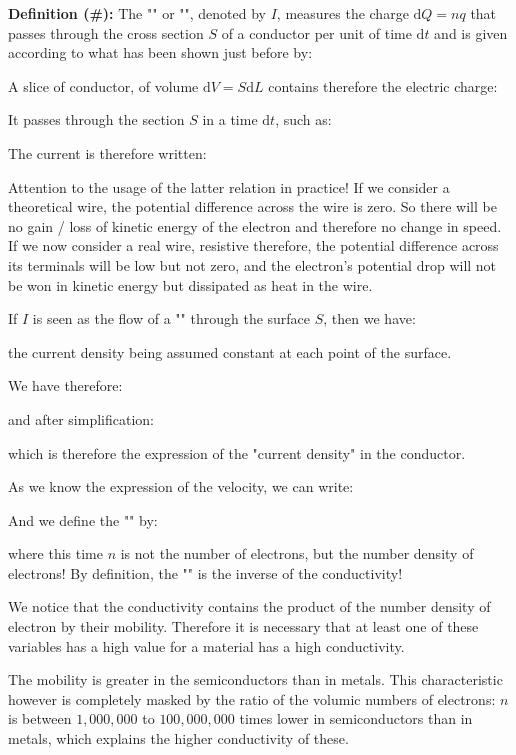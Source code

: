 	\textbf{Definition (\#\mydef):} The "" or "", denoted by $I$,  measures the charge $\mathrm{d}Q=nq$ that passes through the cross section $S$ of a conductor per unit of time $\mathrm{d}t$ and is given according to what has been shown just before by:
	
	A slice of conductor, of volume $\mathrm{d}V=S\mathrm{d}L$ contains therefore the electric charge:
	
	It passes through the section $S$ in a time $\mathrm{d}t$, such as:
	
	The current is therefore written:
	
	\begin{tcolorbox}[title=Remark,colframe=black,arc=10pt]
	Attention to the usage of the latter relation in practice! If we consider a theoretical wire, the potential difference across the wire is zero. So there will be no gain / loss of kinetic energy of the electron and therefore no change in speed. If we now consider a real wire, resistive therefore, the potential difference across its terminals will be low but not zero, and the electron's potential drop will not be won in kinetic energy but dissipated as heat in the wire.
	\end{tcolorbox}
	If $I$ is seen as the flow of a "" through the surface $S$, then we have:
	
	the current density being assumed constant at each point of the surface.
	
	We have therefore:
	
	and after simplification:
	
	which is therefore the expression of the "current density" in the conductor.

	As we know the expression of the velocity, we can write:
	
	And we define the "" by:
	
	where this time $n$ is not the number of electrons, but the number density of electrons! By definition, the "" is the inverse of the conductivity!
	
	We notice that the conductivity contains the product of the number density of electron by their mobility. Therefore it is necessary that at least one of these variables has a high value for a material has a high conductivity.
	
	The mobility is greater in the semiconductors than in metals. This characteristic however is completely masked by the ratio of the volumic numbers of electrons: $n$ is between $1,000,000$ to $100,000,000$ times lower in semiconductors than in metals, which explains the higher conductivity of these.
	
